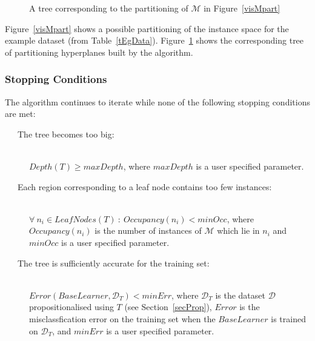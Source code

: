 \documentclass[a4paper,12pt]{article} %
\newcommand{\mcl}[1]{\mathcal{#1}}
\begin{document}
\begin{figure}
\begin{center}
\end{center}
\caption{A tree corresponding to the partitioning of $\mcl{M}$ in Figure~\ref{visMpart}}
\label{visMTree}
\end{figure}
    
Figure~\ref{visMpart} shows a possible partitioning of 
    the instance space for the example dataset (from Table~\ref{tEgData}).
Figure~\ref{visMTree} shows the corresponding tree of partitioning hyperplanes built by
    the algorithm.

\subsubsection{Stopping Conditions}
\label{secStopCond}

The algorithm continues to iterate while none of the following stopping conditions are met:
\begin{description}

\item[~~~The tree becomes too big:] \ \\
    $Depth(T) \geq maxDepth$, 
    where  $maxDepth$ is a user specified parameter.
\item[~~~Each region corresponding to a leaf node contains too few instances:] \ \\ 
    $\forall~n_i \in LeafNodes(T) ~:~ Occupancy(n_i) < minOcc$, 
    where $Occupancy(n_i)$ is the number of instances of $\mcl{M}$ which lie in $n_i$ and
    $minOcc$ is a user specified parameter.
\item[~~~The tree is sufficiently accurate for the training set:] \ \\
    $Error(BaseLearner, \mcl{D}_T) < minErr$, 
    where $\mcl{D}_T$ is the dataset $\mcl{D}$ propositionalised using $T$ (see Section~\ref{secProp}),
    $Error$ is the misclassfication error on the training set when 
    the $BaseLearner$ is trained on $\mcl{D}_T$,
    and $minErr$ is a user specified parameter.

\end{description}
\end{document}
